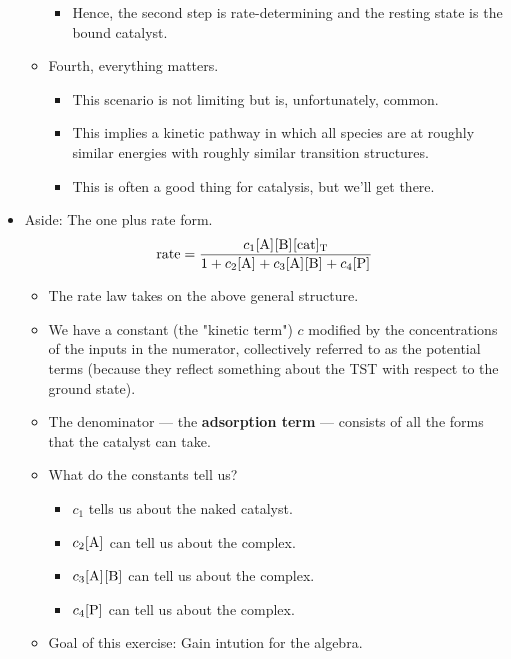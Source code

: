 \documentclass[../notes.tex]{subfiles}
\begin{document}
\begin{itemize}
\begin{itemize}
\begin{itemize}
            \item Hence, the second step is rate-determining and the resting state is the bound catalyst.
        \end{itemize}
        \item Fourth, everything matters.
        \begin{itemize}
            \item This scenario is not limiting but is, unfortunately, common.
            \item This implies a kinetic pathway in which all species are at roughly similar energies with roughly similar transition structures.
            \item This is often a good thing for catalysis, but we'll get there.
        \end{itemize}
    \end{itemize}
    \item Aside: The one plus rate form.
    \begin{equation*}
        \rate = \frac{c_1\cnc{A}\cnc{B}\cnc[T]{cat}}{1+c_2\cnc{A}+c_3\cnc{A}\cnc{B}+c_4\cnc{P}}
    \end{equation*}
    \begin{itemize}
        \item The rate law takes on the above general structure.
        \item We have a constant (the "kinetic term") $c$ modified by the concentrations of the inputs in the numerator, collectively referred to as the potential terms (because they reflect something about the TST with respect to the ground state).
        \item The denominator --- the \textbf{adsorption term} --- consists of all the forms that the catalyst can take.
        \item What do the constants tell us?
        \begin{itemize}
            \item $c_1$ tells us about the naked catalyst.
            \item $c_2\cnc{A}$ can tell us about the  complex.
            \item $c_3\cnc{A}\cnc{B}$ can tell us about the  complex.
            \item $c_4\cnc{P}$ can tell us about the  complex.
        \end{itemize}
        \item Goal of this exercise: Gain intution for the algebra.
        \begin{itemize}

\end{itemize}
\end{itemize}
\end{itemize}
\end{document}
